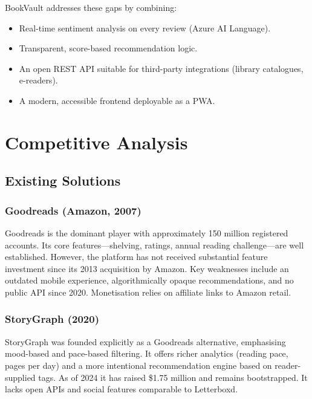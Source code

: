 \documentclass[12pt, a4paper]{report}
\begin{document}
BookVault addresses these gaps by combining:
\begin{itemize}[nosep]
  \item Real-time sentiment analysis on every review (Azure AI Language).
  \item Transparent, score-based recommendation logic.
  \item An open REST API suitable for third-party integrations (library catalogues, e-readers).
  \item A modern, accessible frontend deployable as a PWA.
\end{itemize}

\chapter{Competitive Analysis}

\section{Existing Solutions}

\subsection{Goodreads (Amazon, 2007)}

Goodreads is the dominant player with approximately 150 million registered accounts.
Its core features—shelving, ratings, annual reading challenge—are well established.
However, the platform has not received substantial feature investment since its 2013 acquisition
by Amazon. Key weaknesses include an outdated mobile experience, algorithmically opaque
recommendations, and no public API since 2020. Monetisation relies on affiliate links to
Amazon retail.

\subsection{StoryGraph (2020)}

StoryGraph was founded explicitly as a Goodreads alternative, emphasising mood-based and
pace-based filtering. It offers richer analytics (reading pace, pages per day) and a more
intentional recommendation engine based on reader-supplied tags. As of 2024 it has raised
\$1.75 million and remains bootstrapped. It lacks open APIs and social features comparable
to Letterboxd.
\end{document}
